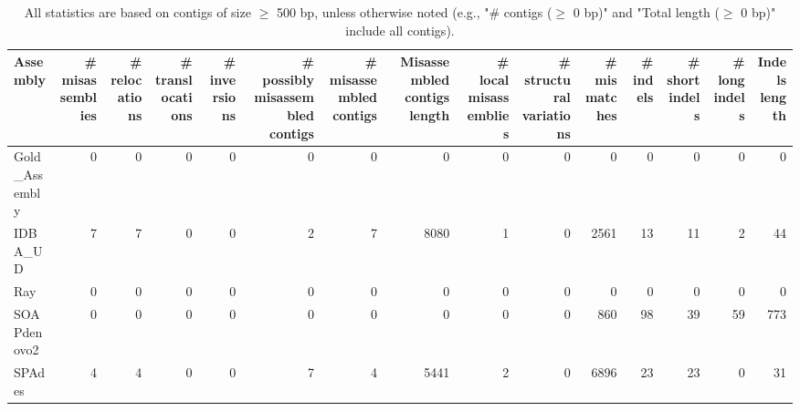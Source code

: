 \documentclass[12pt,a4paper]{article}
\begin{document}
\begin{table}[ht]
\begin{center}
\caption{All statistics are based on contigs of size $\geq$ 500 bp, unless otherwise noted (e.g., "\# contigs ($\geq$ 0 bp)" and "Total length ($\geq$ 0 bp)" include all contigs).}
\begin{tabular}{|l*{14}{|r}|}
\hline
Assembly & \# misassemblies &     \# relocations &     \# translocations &     \# inversions & \# possibly misassembled contigs & \# misassembled contigs & Misassembled contigs length & \# local misassemblies & \# structural variations & \# mismatches & \# indels &     \# short indels &     \# long indels & Indels length \\ \hline
Gold\_Assembly & 0 & 0 & 0 & 0 & 0 & 0 & 0 & 0 & 0 & 0 & 0 & 0 & 0 & 0 \\ \hline
IDBA\_UD & 7 & 7 & 0 & 0 & 2 & 7 & 8080 & 1 & 0 & 2561 & 13 & 11 & 2 & 44 \\ \hline
Ray & 0 & 0 & 0 & 0 & 0 & 0 & 0 & 0 & 0 & 0 & 0 & 0 & 0 & 0 \\ \hline
SOAPdenovo2 & 0 & 0 & 0 & 0 & 0 & 0 & 0 & 0 & 0 & 860 & 98 & 39 & 59 & 773 \\ \hline
SPAdes & 4 & 4 & 0 & 0 & 7 & 4 & 5441 & 2 & 0 & 6896 & 23 & 23 & 0 & 31 \\ \hline
\end{tabular}
\end{center}
\end{table}
\end{document}
